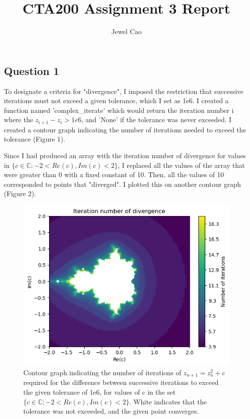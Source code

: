 \documentclass{article}
\title{CTA200 Assignment 3 Report}
\author{Jewel Cao}
\begin{document}
\maketitle
\begin{multicols}{2}

\section{Question 1}

To designate a criteria for "divergence", I imposed the restriction that successive iterations must not exceed a given tolerance, which I set as 1e6. I created a function named 'complex\_iterate' which would return the iteration number i where the $z_{i+1} - z_i > 1e6$, and 'None' if the tolerance was never exceeded. I created a contour graph indicating the number of iterations needed to exceed the tolerance (Figure 1). 

Since I had produced an array with the iteration number of divergence for values in $\{c \in \mathbb{C} : -2 < Re(c), Im(c) < 2\}$, I replaced all the values of the array that were greater than 0 with a fixed constant of 10. Then, all the values of 10 corresponded to points that "diverged". I plotted this on another contour graph (Figure 2). 

\begin{figure} [H]
    \centering
    \includegraphics[width=1.0\linewidth]{Assignment 3 Images/download.png}
    \caption{Contour graph indicating the number of iterations of $z_{n+1} = z_{n}^2 + c$ required for the difference between successive iterations to exceed the given tolerance of 1e6, for values of c in the set $\{c \in \mathbb{C} : -2 < Re(c), Im(c) < 2\}$. White indicates that the tolerance was not exceeded, and the given point converges.}
    \label{fig:enter-label}
\end{figure}


\end{multicols}
\end{document}

